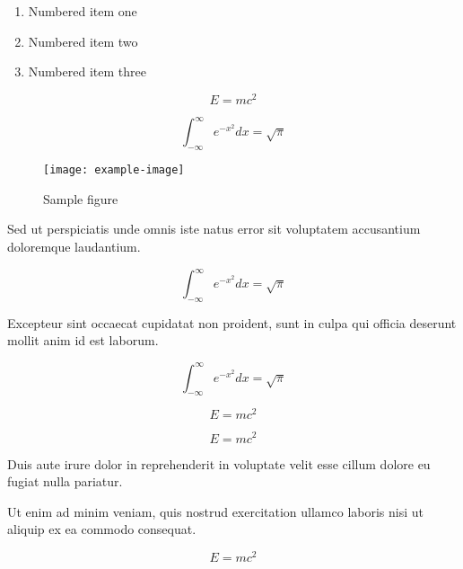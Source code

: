\documentclass{article}
\begin{document}
\begin{enumerate}
\item Numbered item one
\item Numbered item two
\item Numbered item three
\end{enumerate}


\begin{equation}
    E = mc^2
\end{equation}

\begin{equation}
    \int_{-\infty}^{\infty} e^{-x^2} dx = \sqrt{\pi}
\end{equation}

\begin{figure}[h]
    \centering
    \texttt{[image: example-image]}
    \caption{Sample figure}
    \label{fig:sample}
\end{figure}

Sed ut perspiciatis unde omnis iste natus error sit voluptatem accusantium doloremque laudantium.


\begin{equation}
    \int_{-\infty}^{\infty} e^{-x^2} dx = \sqrt{\pi}
\end{equation}

Excepteur sint occaecat cupidatat non proident, sunt in culpa qui officia deserunt mollit anim id est laborum.

\begin{equation}
    \int_{-\infty}^{\infty} e^{-x^2} dx = \sqrt{\pi}
\end{equation}

\begin{equation}
    E = mc^2
\end{equation}

\begin{equation}
    E = mc^2
\end{equation}

Duis aute irure dolor in reprehenderit in voluptate velit esse cillum dolore eu fugiat nulla pariatur.


Ut enim ad minim veniam, quis nostrud exercitation ullamco laboris nisi ut aliquip ex ea commodo consequat.

\begin{equation}
    E = mc^2
\end{equation}
\end{document}
